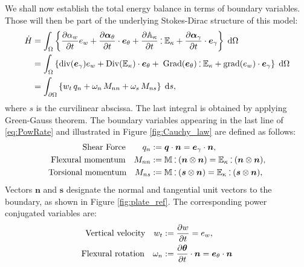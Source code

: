 \documentclass[preprint,12pt]{elsarticle}
\newcommand{\secondReviewer}[1]{\textcolor{blue!80!black}{#1}}
\def\onedot{$\mathsurround0pt\ldotp$}
\def\cddot{%
	\mathbin{\vcenter{\baselineskip.67ex
			\hbox{\onedot}\hbox{\onedot}}%
}}
\begin{document}
\secondReviewer{
We shall now establish the total energy balance in terms of boundary variables. Those will then be part of the underlying Stokes-Dirac structure of this model:
\begin{equation}
\label{eq:PowRate}
\begin{aligned}
\dot{H}&= \int_{\Omega} \left\{ \diffp{\alpha_w}{t} e_w  + \diffp{\bm\alpha_\theta}{t} \cdot \bm{e}_\theta + \diffp{\mathbb{A}_{\kappa}}{t} \cddot \mathbb{E}_{\kappa}  + \diffp{\bm\alpha_{\gamma}}{t} \cdot \bm{e}_{\gamma} \right\} \d\Omega\\
&= \int_{\Omega} \left\{ \mathrm{div}(\bm{e}_{\gamma}) e_w  + \mathrm{Div}(\mathbb{E}_{\kappa}) \cdot \bm{e}_\theta + \; \mathrm{Grad}(\bm{e}_{\theta}) \cddot \mathbb{E}_{\kappa}  + \mathrm{grad} (e_w) \cdot \bm{e}_{\gamma} \right\} \d\Omega \\
&= \int_{\partial \Omega} \left\{ w_t \, q_n  + \omega_n \, M_{nn} + \omega_s \, M_{ns} \right\} \d{s},  \\
\end{aligned}
\end{equation}
where $s$ is the curvilinear abscissa. The last integral is obtained by applying Green-Gauss theorem. The boundary variables appearing in the last line of \eqref{eq:PowRate} and illustrated in Figure \ref{fig:Cauchy_law} are defined as follows:
\begin{equation}
\label{eq:QnMnnMns}
\begin{aligned}
\text{Shear Force}  \qquad q_{n} &:= \bm{q} \cdot \bm{n}=  \bm{e}_{\gamma} \cdot \bm{n},  \\
\text{Flexural momentum} \quad 
M_{nn} &:=  \mathbb{M} \cddot (\bm{n}\otimes{\bm{n}}) = \mathbb{E}_{\kappa} \cddot (\bm{n}\otimes{\bm{n}}) 	\\
\text{Torsional momentum} \quad M_{ns} &:= \mathbb{M} \cddot (\bm{s}\otimes{\bm{n}}) = \mathbb{E}_{\kappa} \cddot (\bm{s}\otimes{\bm{n}}),	
\end{aligned},
\end{equation}
Vectors $\bm{n}$ and $\bm{s}$ designate the normal and tangential unit vectors to the boundary, as shown in Figure \ref{fig:plate_ref}. The corresponding power conjugated variables are:
\begin{equation}
\label{eq:wtwnws}
\begin{aligned}
\text{Vertical velocity}  \quad w_t &:= \diffp{w}{t} = e_w, \\
\text{Flexural rotation} \quad 
\omega_{n} &:= \diffp{\bm{\theta}}{t} \cdot \bm{n} = \bm{e}_\theta \cdot \bm{n} \\

\end{aligned}
\end{equation}}
\end{document}
